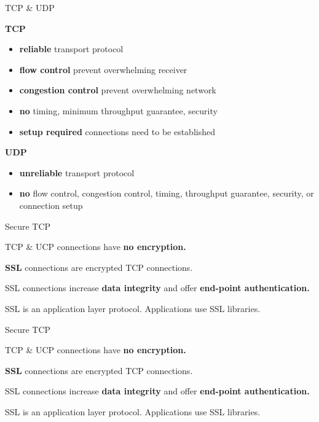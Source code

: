 \begin{topic}{TCP \& UDP}
\begin{multicols}{2}
\textbf{TCP}\\

\begin{itemize}
	\item \textbf{reliable} transport protocol
	\item \textbf{flow control} prevent overwhelming receiver
	\item \textbf{congestion control} prevent overwhelming network
	\item \textbf{no} timing, minimum throughput guarantee, security
	\item \textbf{setup required} connections need to be established
\end{itemize}

\columnbreak
\textbf{UDP}\\

\begin{itemize}
	\item \textbf{unreliable} transport protocol
	\item \textbf{no} flow control, congestion control, timing, throughput guarantee, security, or connection setup
\end{itemize}
\end{multicols}
\end{topic}

\begin{topic}{Secure TCP}

TCP \& UCP connections have \textbf{no encryption.}

\textbf{SSL} connections are encrypted TCP connections.

SSL connections increase \textbf{data integrity} and offer \textbf{end-point authentication.}

SSL is an application layer protocol. Applications use SSL libraries.

\end{topic}

\begin{topic}{Secure TCP}

TCP \& UCP connections have \textbf{no encryption.}

\textbf{SSL} connections are encrypted TCP connections.

SSL connections increase \textbf{data integrity} and offer \textbf{end-point authentication.}

SSL is an application layer protocol. Applications use SSL libraries.

\end{topic}

